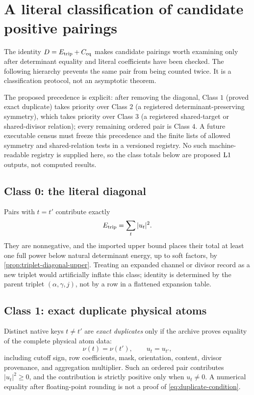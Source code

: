 \section{A literal classification of candidate positive pairings}
\label{sec:pairing-classification}

The identity \(D=E_{\mathrm{trip}}+C_{\mathrm{eq}}\) makes candidate pairings worth
examining only after determinant equality and literal coefficients
have been checked.  The following hierarchy prevents the same pair
from being counted twice.  It is a classification protocol, not an
asymptotic theorem.

The proposed precedence is explicit: after removing the diagonal,
Class \(1\) (proved exact duplicate) takes priority over Class \(2\)
(a registered determinant-preserving symmetry), which takes priority
over Class \(3\) (a registered shared-target or shared-divisor
relation); every remaining ordered pair is Class \(4\).  A future
executable census must freeze this precedence and the finite lists of
allowed symmetry and shared-relation tests in a versioned registry.
No such machine-readable registry is supplied here, so the class
totals below are proposed \(\mathrm{L1}\) outputs, not computed results.

\subsection{Class 0: the literal diagonal}

Pairs with \(t=t'\) contribute exactly
\[
 E_{\mathrm{trip}}=\sum_t|u_t|^2.
\]
They are nonnegative, and the imported upper bound places their total
at least one full power below natural determinant energy, up to soft
factors, by \cref{prop:triplet-diagonal-upper}.  Treating an expanded
channel or divisor record as a new triplet would artificially inflate
this class; identity is determined by the parent triplet
\((\alpha,\gamma,j)\), not by a row in a flattened expansion table.

\subsection{Class 1: exact duplicate physical atoms}

Distinct native keys \(t\ne t'\) are \emph{exact duplicates} only if
the archive proves equality of the complete physical atom data:
\begin{equation}
 \nu(t)=\nu(t'),\qquad
 u_t=u_{t'},
\label{eq:duplicate-condition}
\end{equation}
including cutoff sign, row coefficients, mask, orientation, content,
divisor provenance, and aggregation multiplier.  Such an ordered pair
contributes \(|u_t|^2\ge0\), and the contribution is strictly positive
only when \(u_t\ne0\).  A numerical equality after floating-point
rounding is not a proof of \eqref{eq:duplicate-condition}.

